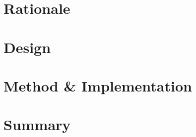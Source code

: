 \label{sec:rebuilding:introduction}



\section{Rationale}
\label{sec:rebuilding:rationale}



\section{Design}
\label{sec:rebuilding:design}



\section{Method \& Implementation}
\label{sec:rebuilding:method}



\section{Summary}
\label{sec:rebuilding:summary}



